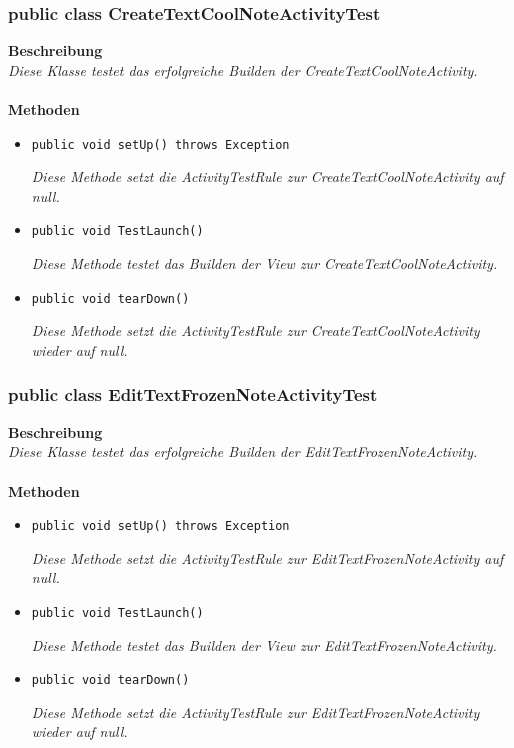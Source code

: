 \documentclass[a4paper]{scrreprt}
\begin{document}
	\subsubsection{public class CreateTextCoolNoteActivityTest}
	\textbf{Beschreibung}\\
	\textit{Diese Klasse testet das erfolgreiche Builden der CreateTextCoolNoteActivity.}\\
	\\	
	\textbf{Methoden}
	\begin{itemize}
		
		\item\texttt{{public void setUp() throws Exception}}
		
		\textit{Diese Methode setzt die ActivityTestRule zur CreateTextCoolNoteActivity auf null.}
		
		\item\texttt{{public void TestLaunch()}}
		
		\textit{Diese Methode testet das Builden der View zur CreateTextCoolNoteActivity.}
		
		\item\texttt{{public void tearDown()}}
		
		\textit{Diese Methode setzt die ActivityTestRule zur CreateTextCoolNoteActivity wieder auf null.}
		
		
	\end{itemize}
	\subsubsection{public class EditTextFrozenNoteActivityTest}
	\textbf{Beschreibung}\\
	\textit{Diese Klasse testet das erfolgreiche Builden der EditTextFrozenNoteActivity.}\\
	\\	
	\textbf{Methoden}
	\begin{itemize}
		
		\item\texttt{{public void setUp() throws Exception}}
		
		\textit{Diese Methode setzt die ActivityTestRule zur EditTextFrozenNoteActivity auf null.}
		
		\item\texttt{{public void TestLaunch()}}
		
		\textit{Diese Methode testet das Builden der View zur EditTextFrozenNoteActivity.}
		
		\item\texttt{{public void tearDown()}}
		
		\textit{Diese Methode setzt die ActivityTestRule zur EditTextFrozenNoteActivity wieder auf null.}
		
		
	\end{itemize}
\end{document}
